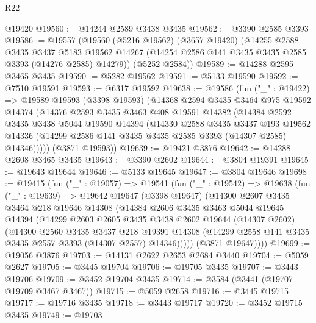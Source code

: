 \begin{lexlean}{R22}
\begin{coremodule}
    @19420
@19560 := @14244 @2589 @3438 @3435
@19562 := @3390 @2585 @3393
@19586 := @19557
    (@19560
      (@5216 @19562)
      (@3657 @19420)
      (@14255
        @2588
        @3435
        @3437
        @5183
        @19562
        @14267
        (@14254 @2586 @141 @3435 @3435 @2585 @3393 (@14276 @2585) @14279))
      (@5252 @2584))
@19589 := @14288 @2595 @3465 @3435
@19590 := @5282 @19562
@19591 := @5133 @19590
@19592 := @7510 @19591
@19593 := @6317 @19592
@19638 := @19586
    (fun ("_" : @19422) =>
    @19589
      @19593
      (@3398 @19593)
      (@14368
        @2594
        @3435
        @3464
        @975
        @19592
        @14374
        (@14376
          @2593
          @3435
          @3463
          @408
          @19591
          @14382
          (@14384
            @2592
            @3435
            @3438
            @5044
            @19590
            @14394
            (@14330
              @2588
              @3435
              @3437
              @193
              @19562
              @14336
              (@14299 @2586 @141 @3435 @3435 @2585 @3393 (@14307 @2585) @14346)))))
      (@3871 @19593))
@19639 := @19421 @3876
@19642 := @14288 @2608 @3465 @3435
@19643 := @3390 @2602
@19644 := @3804 @19391
@19645 := @19643 @19644
@19646 := @5133 @19645
@19647 := @3804 @19646
@19698 := @19415
    (fun ("_" : @19057) =>
    @19541
      (fun ("_" : @19542) =>
      @19638
        (fun ("_" : @19639) =>
        @19642
          @19647
          (@3398 @19647)
          (@14300
            @2607
            @3435
            @3464
            @218
            @19646
            @14308
            (@14384
              @2606
              @3435
              @3463
              @5044
              @19645
              @14394
              (@14299
                @2603
                @2605
                @3435
                @3438
                @2602
                @19644
                (@14307 @2602)
                (@14300
                  @2560
                  @3435
                  @3437
                  @218
                  @19391
                  @14308
                  (@14299 @2558 @141 @3435 @3435 @2557 @3393 (@14307 @2557) @14346)))))
          (@3871 @19647))))
@19699 := @19056 @3876
@19703 := @14131 @2622 @2653 @2684 @3440
@19704 := @5059 @2627
@19705 := @3445 @19704
@19706 := @19705 @3435
@19707 := @3443 @19706
@19709 := @3452 @19704 @3435
@19714 := @3584 (@3441 (@19707 @19709 @3467 @3467))
@19715 := @5059 @2658
@19716 := @3445 @19715
@19717 := @19716 @3435
@19718 := @3443 @19717
@19720 := @3452 @19715 @3435
@19749 := @19703

\end{coremodule}
\end{lexlean}
